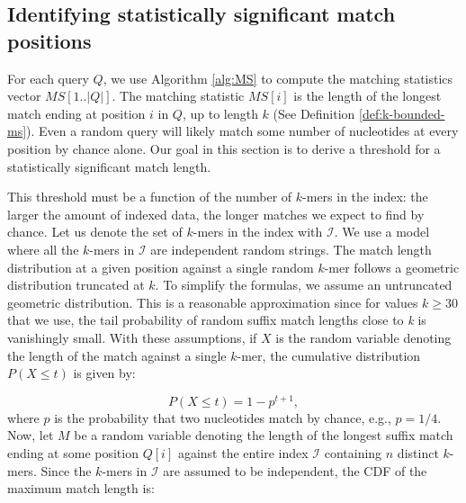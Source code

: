 \documentclass[unnumsec,webpdf,contemporary,large]{oup-authoring-template}%
\theoremstyle{thmstyleone}%
\theoremstyle{thmstyletwo}%
\theoremstyle{thmstylethree}%
\begin{document}
\subsection{Identifying statistically significant match positions}\label{sec:random-match-model}
For each query $Q$, we use Algorithm \ref{alg:MS} to compute the matching statistics vector $MS[1..|Q|]$. The matching statistic $MS[i]$ is the length of the longest match ending at position $i$ in $Q$, up to length $k$ (See Definition \ref{def:k-bounded-ms}). Even a random query will likely match some number of nucleotides at every position by chance alone. Our goal in this section is to derive a threshold for a statistically significant match length.

This threshold must be a function of the number of $k$-mers in the index: the larger the amount of indexed data, the longer matches we expect to find by chance. Let us denote the set of $k$-mers in the index with $\mathcal I$. We use a model where all the $k$-mers in $\mathcal I$ are independent random strings. The match length distribution at a given position against a single random $k$-mer follows a geometric distribution truncated at $k$. To simplify the formulas, we assume an untruncated geometric distribution. This is a reasonable approximation since for values $k \geq 30$ that we use, the tail probability of random suffix match lengths close to \emph{k} is vanishingly small. With these assumptions, if $X$ is the random variable denoting the length of the match against a single $k$-mer, the cumulative distribution $P(X \leq t)$ is given by:

\begin{equation}
    P\left(X \leq t\right) = 1 - p^{t + 1},
\label{geom-distribution}
\end{equation}
where $p$ is the probability that two nucleotides match by chance, e.g., $p = 1/4$. Now, let $M$ be a random variable denoting the length of the longest suffix match ending at some position $Q[i]$ against the entire index $\mathcal{I}$ containing $n$ distinct $k$-mers. Since the $k$-mers in $\mathcal I$ are assumed to be independent, the CDF of the maximum match length is:

\end{document}
